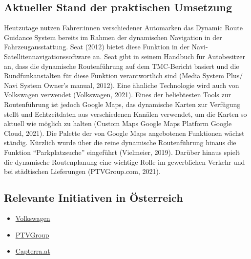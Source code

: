 \documentclass[
]{book}
\providecommand{\tightlist}{%
  \setlength{\itemsep}{0pt}\setlength{\parskip}{0pt}}
\begin{document}
\hypertarget{aktueller-stand-der-praktischen-umsetzung-13}{%
\subsection*{Aktueller Stand der praktischen Umsetzung}\label{aktueller-stand-der-praktischen-umsetzung-13}}

Heutzutage nutzen Fahrer:innen verschiedener Automarken das Dynamic Route Guidance System bereits im Rahmen der dynamischen Navigation in der Fahrzeugausstattung. Seat (2012) bietet diese Funktion in der Navi-Satellitennavigationssoftware an. Seat gibt in seinem Handbuch für Autobesitzer an, dass die dynamische Routenführung auf dem TMC-Bericht basiert und die Rundfunkanstalten für diese Funktion verantwortlich sind (Media System Plus/ Navi System Owner's manual, 2012). Eine ähnliche Technologie wird auch von Volkswagen verwendet (Volkswagen, 2021). Eines der beliebtesten Tools zur Routenführung ist jedoch Google Maps, das dynamische Karten zur Verfügung stellt und Echtzeitdaten aus verschiedenen Kanälen verwendet, um die Karten so aktuell wie möglich zu halten (Custom Maps \textbar{} Google Maps Platform \textbar{} Google Cloud, 2021). Die Palette der von Google Maps angebotenen Funktionen wächst ständig. Kürzlich wurde über die reine dynamische Routenführung hinaus die Funktion ``Parkplatzsuche'' eingeführt (Vielmeier, 2019). Darüber hinaus spielt die dynamische Routenplanung eine wichtige Rolle im gewerblichen Verkehr und bei städtischen Lieferungen (PTVGroup.com, 2021).

\hypertarget{relevante-initiativen-in-uxf6sterreich-13}{%
\subsection*{Relevante Initiativen in Österreich}\label{relevante-initiativen-in-uxf6sterreich-13}}

\begin{itemize}
\tightlist
\item
  \href{https://www.volkswagen.at/technik-lexikon/navigationssystem}{Volkswagen}
\item
  \href{https://blog.ptvgroup.com/de/stadt-und-mobilitaet/routing-engine-hyperpath/}{PTVGroup}
\item
  \href{https://www.capterra.at/directory/30944/route-planning/software}{Capterra.at}
\end{itemize}
\end{document}
